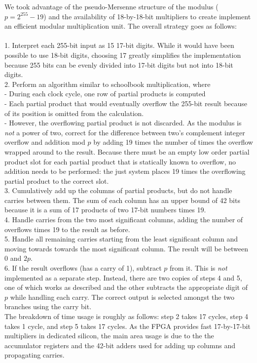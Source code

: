 \documentclass[a4paper]{report}
\begin{document}
We took advantage of the pseudo-Mersenne structure of the modulus
($p=2^{255}-19$) and the availability of 18-by-18-bit multipliers to create
implement an efficient modular multiplication unit. The overall strategy goes as
follows: \\ \\
1. Interpret each 255-bit input as 15 17-bit digits. While it would have been
possible to use 18-bit digits, choosing 17 greatly simplifies the implementation
because 255 bits can be evenly divided into 17-bit digits but not into 18-bit
digits. \\
2. Perform an algorithm similar to schoolbook multiplication, where \\
- During each clock cycle, one row of partial products is computed \\
- Each partial product that would eventually overflow the 255-bit result
because of its position is omitted from the calculation. \\
- However, the overflowing partial product is not discarded. As the modulus
is \emph{not} a power of two, correct for the difference between two's
complement integer overflow and addition mod $p$ by adding 19 times the number
of times the overflow wrapped around to the result. Because there must be an
empty low order partial product slot for each partial product that is statically
known to overflow, no addition needs to be performed: the just system places 19
times the overflowing partial product to the correct slot. \\
3. Cumulatively add up the columns of partial products, but do not handle
carries between them. The sum of each column has an upper bound of 42 bits
because it is a sum of 17 products of two 17-bit numbers times 19. \\
4. Handle carries from the two most significant columns, adding the number of
overflows times 19 to the result as before. \\
5. Handle all remaining carries starting from the least significant column and
moving towards towards the most significant column. The result will %
be between $0$ and $2p$. \\
6. If the result overflows (has a carry of 1), subtract $p$ from it. This is \emph{not}  implemented as a
separate step. Instead, there are two copies of steps 4 and 5, one of which
works as described and the other subtracts the appropriate digit of $p$ while
handling each carry. The correct output is selected amongst the two branches
using the carry bit. \\

The breakdown of time usage is roughly as follows: step 2 takes 17 cycles, step
4 takes 1 cycle, and step 5 takes 17 cycles. As the FPGA provides fast
17-by-17-bit multipliers in dedicated silicon, the main area usage is due to the
the accumulator registers and the 42-bit adders used for adding up columns and
propagating carries.
\end{document}
